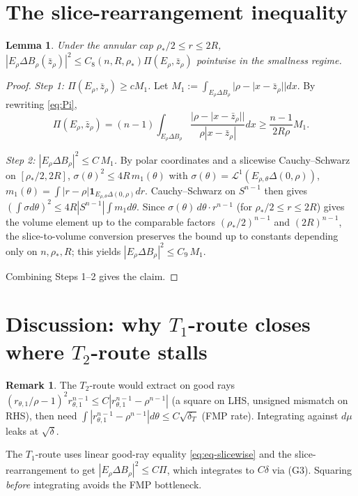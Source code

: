 \documentclass[11pt]{article}
\newtheorem{lemma}[theorem]{Lemma}
\theoremstyle{definition}
\newtheorem{remark}[theorem]{Remark}
\newcommand{\rstar}{\rho_{*}}
\newcommand{\zbar}{\bar z_{\rho}}
\newcommand{\PiE}{\Pi(E_{\rho},\zbar)}
\begin{document}
\section{The slice-rearrangement inequality}\label{sec:slice}

\begin{lemma}\label{lem:slice-rearrange}
Under the annular cap $\rstar/2\le r\le 2R$,
$|E_\rho\Delta B_\rho(\zbar)|^2\le C_8(n,R,\rstar)\PiE$ pointwise in
the smallness regime.
\end{lemma}

\begin{proof}
\emph{Step 1: $\PiE\ge c M_1$.} Let $M_1:=\int_{E_\rho\Delta B_\rho}|\rho-|x-\zbar||dx$.
By rewriting \eqref{eq:Pi},
\[
   \PiE = (n-1)\int_{E_\rho\Delta B_\rho}\frac{|\rho-|x-\zbar||}{\rho|x-\zbar|}dx \ge\frac{n-1}{2R\rho}M_1.
\]

\emph{Step 2: $|E_\rho\Delta B_\rho|^2\le C\,M_1$.} By polar coordinates
and a slicewise Cauchy--Schwarz on $[\rstar/2,2R]$,
$\sigma(\theta)^2\le 4R\,m_1(\theta)$ with
$\sigma(\theta)=\mathcal L^1(E_{\rho,\theta}\Delta(0,\rho))$,
$m_1(\theta)=\int|r-\rho|\mathbf 1_{E_{\rho,\theta}\Delta(0,\rho)}dr$.
Cauchy--Schwarz on $S^{n-1}$ then gives
$(\int\sigma d\theta)^2\le 4R|S^{n-1}|\int m_1 d\theta$. Since
$\sigma(\theta)\,d\theta\cdot r^{n-1}$ (for $\rstar/2\le r\le 2R$)
gives the volume element up to the comparable factors $(\rstar/2)^{n-1}$
and $(2R)^{n-1}$, the slice-to-volume conversion preserves the bound up
to constants depending only on $n,\rstar,R$; this yields
$|E_\rho\Delta B_\rho|^2\le C_9\,M_1$.

Combining Steps 1--2 gives the claim.
\end{proof}

\section{Discussion: why $T_1$-route closes where $T_2$-route stalls}\label{sec:discussion}

\begin{remark}
The $T_2$-route would extract on good rays
$(r_{\theta,1}/\rho-1)^2 r_{\theta,1}^{n-1}\le C|r_{\theta,1}^{n-1}-\rho^{n-1}|$
(a square on LHS, unsigned mismatch on RHS), then need
$\int|r_{\theta,1}^{n-1}-\rho^{n-1}|d\theta\le C\sqrt{\delta_T}$
(FMP rate). Integrating against $d\mu$ leaks at $\sqrt\delta$.

The $T_1$-route uses linear good-ray equality \eqref{eq:eq-slicewise}
and the slice-rearrangement to get $|E_\rho\Delta B_\rho|^2\le C\Pi$,
which integrates to $C\delta$ via (G3). Squaring \emph{before}
integrating avoids the FMP bottleneck.
\end{remark}
\end{document}
